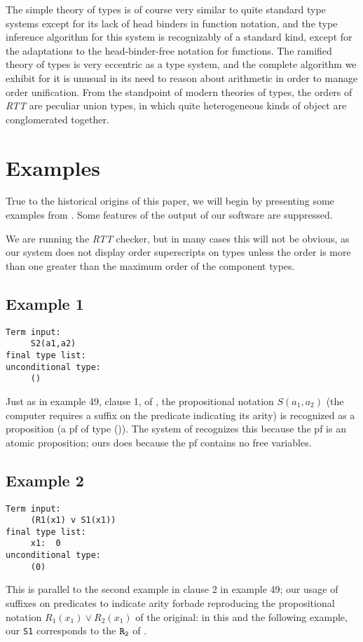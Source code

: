 \documentclass{article}
\begin{document}
The simple theory of types is of course very similar to quite standard
type systems except for its lack of head binders in function notation,
and the type inference algorithm for this system is recognizably of a
standard kind, except for the adaptations to the head-binder-free
notation for functions.  The ramified theory of types is very
eccentric as a type system, and the complete algorithm we exhibit for
it is unusual in its need to reason about arithmetic in order to
manage order unification.  From the standpoint of modern theories of
types, the orders of {\em RTT\/} are peculiar union types, in which
quite heterogeneous kinds of object are conglomerated together.

\section{Examples}

True to the historical origins of this paper, we will begin by
presenting some examples from \cite{types40}.  Some features of the
output of our software are suppressed.

We are running the {\em RTT\/} checker, but in many cases this will
not be obvious, as our system does not display order superscripts on
types unless the order is more than one greater than the maximum order
of the component types.
\subsection{Example 1}
\begin{verbatim}
Term input:
     S2(a1,a2)
final type list:
unconditional type:
     ()
\end{verbatim}

Just as in example 49, clause 1, of \cite{types40}, the propositional
notation $S(a_1,a_2)$ (the computer requires a suffix on the predicate
indicating its arity) is recognized as a proposition (a pf of type
()).  The system of \cite{types40} recognizes this because the pf is
an atomic proposition; ours does because the pf contains no free
variables.
\subsection{Example 2}
\begin{verbatim}
Term input:
     (R1(x1) v S1(x1))
final type list:
     x1:  0
unconditional type:
     (0)
\end{verbatim}

This is parallel to the second example in clause 2 in example 49; our
usage of suffixes on predicates to indicate arity forbade reproducing
the propositional notation  $R_1(x_1) \vee R_2(x_1)$ of the original:  in
this and the following example, our {\tt S1} corresponds to the $\tt R_2$
of \cite{types40}.
\end{document}
